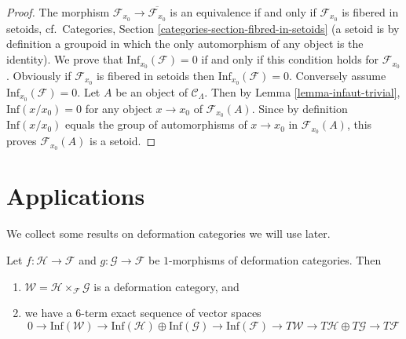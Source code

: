 \begin{proof}
The morphism $\mathcal{F}_{x_0} \to \overline{\mathcal{F}_{x_0}}$ is an
equivalence if and only if $\mathcal{F}_{x_0}$ is fibered in setoids,
cf.\ Categories, Section \ref{categories-section-fibred-in-setoids}
(a setoid is by definition a groupoid in
which the only automorphism of any object is the identity). We prove that
$\text{Inf}_{x_0}(\mathcal{F}) = 0$ if and only if this condition holds
for $\mathcal{F}_{x_0}$.  Obviously if $\mathcal{F}_{x_0}$ is fibered in
setoids then $\text{Inf}_{x_0}(\mathcal{F}) = 0$.  Conversely assume
$\text{Inf}_{x_0}(\mathcal{F}) = 0$.  Let $A$ be an object of
$\mathcal{C}_\Lambda$. Then by
Lemma \ref{lemma-infaut-trivial},
$\text{Inf}(x/x_0) = 0$ for any object $x \to x_0$ of
$\mathcal{F}_{x_0}(A)$. Since by definition $\text{Inf}(x/x_0)$
equals the group of automorphisms of $x \to x_0$ in $\mathcal{F}_{x_0}(A)$,
this proves $\mathcal{F}_{x_0}(A)$ is a setoid.
\end{proof}








\section{Applications}
\label{section-applications}

\noindent
We collect some results on deformation categories we will use later.

\begin{lemma}
\label{lemma-deformation-categories-fiber-product-morphisms}
Let $f : \mathcal{H} \to \mathcal{F}$ and $g : \mathcal{G} \to \mathcal{F}$
be $1$-morphisms of deformation categories. Then
\begin{enumerate}
\item $\mathcal{W} = \mathcal{H} \times_\mathcal{F} \mathcal{G}$ is a
deformation category, and
\item we have a $6$-term exact sequence of vector spaces
$$
0 \to \text{Inf}(\mathcal{W})
\to \text{Inf}(\mathcal{H}) \oplus \text{Inf}(\mathcal{G})
\to \text{Inf}(\mathcal{F}) \to
T\mathcal{W} \to T\mathcal{H} \oplus T\mathcal{G} \to T\mathcal{F}
$$
\end{enumerate}
\end{lemma}

